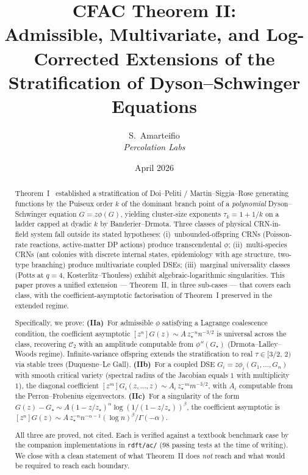 \documentclass[11pt,a4paper]{article}
\title{CFAC Theorem II:\\[4pt]
  \large Admissible, Multivariate, and Log-Corrected Extensions
  of the Stratification of Dyson--Schwinger Equations}
\author{S.\ Amarteifio\\
  \small\textit{Percolation Labs}}
\date{April 2026}
\newcommand{\Cstr}[1]{\mathcal{C}_{#1}}
\theoremstyle{plain}
\theoremstyle{definition}
\begin{document}
\maketitle

\begin{abstract}
Theorem~I~\citep{AmarteifioCFAC2026} established a stratification of
Doi--Peliti / Martin--Siggia--Rose generating functions by the Puiseux
order $k$ of the dominant branch point of a \emph{polynomial} Dyson--Schwinger
equation $G = z\phi(G)$, yielding cluster-size exponents
$\tau_k = 1 + 1/k$ on a ladder capped at dyadic $k$ by Banderier--Drmota.
Three classes of physical CRN-in-field system fall outside its stated
hypotheses: (i)~unbounded-offspring CRNs (Poisson-rate reactions, active-matter
DP actions) produce transcendental $\phi$; (ii)~multi-species CRNs
(ant colonies with discrete internal states, epidemiology with age structure,
two-type branching) produce multivariate coupled DSEs; (iii)~marginal
universality classes (Potts at $q=4$, Kosterlitz--Thouless) exhibit
algebraic-logarithmic singularities.  This paper proves a unified
extension --- Theorem~II, in three sub-cases --- that covers each class,
with the coefficient-asymptotic factorisation of Theorem~I preserved in the
extended regime.

Specifically, we prove:
\textbf{(IIa)}~For admissible $\phi$ satisfying a Lagrange coalescence
condition, the coefficient asymptotic $[z^n]G(z) \sim A\, z_\star^{-n} n^{-3/2}$
is universal across the class, recovering $\Cstr{2}$ with an amplitude computable
from $\phi''(G_\star)$ (Drmota--Lalley--Woods regime).  Infinite-variance
offspring extends the stratification to real $\tau \in [3/2,\, 2)$ via stable
trees (Duquesne--Le Gall).
\textbf{(IIb)}~For a coupled DSE $G_i = z\phi_i(G_1,\dots,G_n)$ with smooth
critical variety (spectral radius of the Jacobian equals $1$ with
multiplicity~$1$), the diagonal coefficient $[z^m] G_i(z,\dots,z) \sim
A_i\, z_\star^{-m} m^{-3/2}$, with $A_i$ computable from the Perron--Frobenius
eigenvectors.
\textbf{(IIc)}~For a singularity of the form
$G(z) - G_\star \sim A(1-z/z_\star)^\alpha \log(1/(1-z/z_\star))^\beta$,
the coefficient asymptotic is
$[z^n] G(z) \sim A\, z_\star^{-n} n^{-\alpha-1}(\log n)^\beta/\Gamma(-\alpha)$.

All three are proved, not cited.  Each is verified against a textbook
benchmark case by the companion implementations in \texttt{rdft/ac/}
(98 passing tests at the time of writing).  We close with a clean
statement of what Theorem~II does \emph{not} reach and what would be
required to reach each boundary.
\end{abstract}
\end{document}
